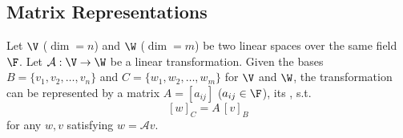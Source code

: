 \subsection{Matrix Representations}\label{ss:matrix-rep}

\begin{definition}
Let $\V$ ($\dim=n$) and $\W$ ($\dim=m$) be two linear spaces over the same field $\F$.
Let $\mathcal{A}:\V\to\W$ be a linear transformation. Given the bases $B=\{v_1,v_2,\dots,v_n\}$ and $C=\{w_1,w_2,\dots,w_m\}$ for $\V$ and $\W$, the transformation can be represented by a matrix $A=[a_{ij}]$ ($a_{ij}\in\F$), its , s.t.
\[
[w]_C=A\,[v]_B
\]
for any $w,v$ satisfying $w=\mathcal{A}v$.
\end{definition}

